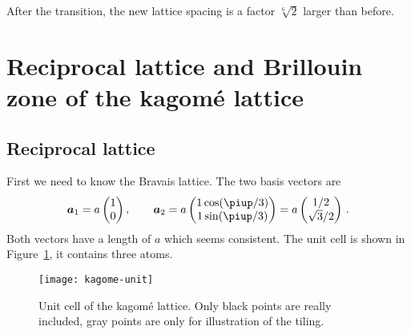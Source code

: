 \documentclass[11pt, english, fleqn, DIV=15, headinclude, BCOR=1cm]{scrartcl}
\begin{document}
After the transition, the new lattice spacing is a factor $\sqrt[6] 2$ larger
than before.

\section{Reciprocal lattice and Brillouin zone of the kagomé lattice}
\label{homework:2}

\subsection{Reciprocal lattice}

First we need to know the Bravais lattice. The two basis vectors are
\[
    \vec a_1 =
    a
    \begin{pmatrix}
        1 \\ 0
    \end{pmatrix}
    \eqnsep
    \vec a_2 =
    a
    \begin{pmatrix}
        1 \cos(\piup/3) \\
        1 \sin(\piup/3)
    \end{pmatrix}
    =
    a
    \begin{pmatrix}
        1/2 \\ \sqrt{3}/2
    \end{pmatrix} \,.
\]
Both vectors have a length of $a$ which seems consistent. The unit cell is
shown in Figure~\ref{fig:kagome-unit}, it contains three atoms.

\begin{figure}[htbp]
    \centering
    \texttt{[image: kagome-unit]}
    \caption{%
        Unit cell of the kagomé lattice. Only black points are really included,
        gray points are only for illustration of the tiling.
    }
    \label{fig:kagome-unit}
\end{figure}
\end{document}
